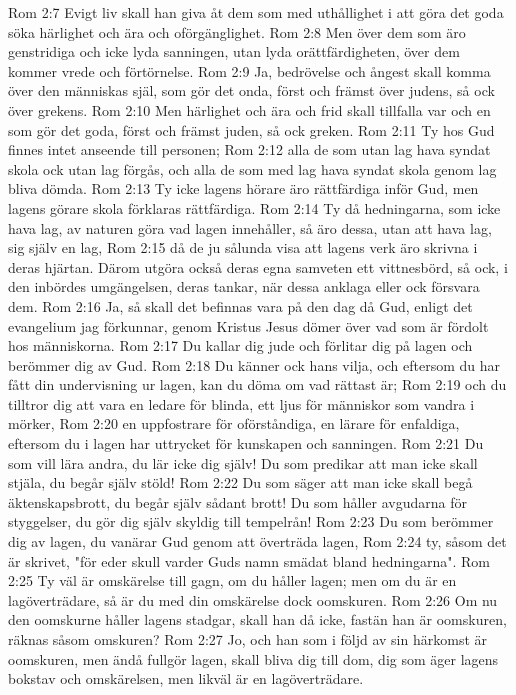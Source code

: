 Rom 2:7  Evigt liv skall han giva åt dem som med uthållighet i att göra det goda söka härlighet och ära och oförgänglighet.
Rom 2:8  Men över dem som äro genstridiga och icke lyda sanningen, utan lyda orättfärdigheten, över dem kommer vrede och förtörnelse.
Rom 2:9  Ja, bedrövelse och ångest skall komma över den människas själ, som gör det onda, först och främst över judens, så ock över grekens.
Rom 2:10  Men härlighet och ära och frid skall tillfalla var och en som gör det goda, först och främst juden, så ock greken.
Rom 2:11  Ty hos Gud finnes intet anseende till personen;
Rom 2:12  alla de som utan lag hava syndat skola ock utan lag förgås, och alla de som med lag hava syndat skola genom lag bliva dömda.
Rom 2:13  Ty icke lagens hörare äro rättfärdiga inför Gud, men lagens görare skola förklaras rättfärdiga.
Rom 2:14  Ty då hedningarna, som icke hava lag, av naturen göra vad lagen innehåller, så äro dessa, utan att hava lag, sig själv en lag,
Rom 2:15  då de ju sålunda visa att lagens verk äro skrivna i deras hjärtan. Därom utgöra också deras egna samveten ett vittnesbörd, så ock, i den inbördes umgängelsen, deras tankar, när dessa anklaga eller ock försvara dem.
Rom 2:16  Ja, så skall det befinnas vara på den dag då Gud, enligt det evangelium jag förkunnar, genom Kristus Jesus dömer över vad som är fördolt hos människorna.
Rom 2:17  Du kallar dig jude och förlitar dig på lagen och berömmer dig av Gud.
Rom 2:18  Du känner ock hans vilja, och eftersom du har fått din undervisning ur lagen, kan du döma om vad rättast är;
Rom 2:19  och du tilltror dig att vara en ledare för blinda, ett ljus för människor som vandra i mörker,
Rom 2:20  en uppfostrare för oförståndiga, en lärare för enfaldiga, eftersom du i lagen har uttrycket för kunskapen och sanningen.
Rom 2:21  Du som vill lära andra, du lär icke dig själv! Du som predikar att man icke skall stjäla, du begår själv stöld!
Rom 2:22  Du som säger att man icke skall begå äktenskapsbrott, du begår själv sådant brott! Du som håller avgudarna för styggelser, du gör dig själv skyldig till tempelrån!
Rom 2:23  Du som berömmer dig av lagen, du vanärar Gud genom att överträda lagen,
Rom 2:24  ty, såsom det är skrivet, "för eder skull varder Guds namn smädat bland hedningarna".
Rom 2:25  Ty väl är omskärelse till gagn, om du håller lagen; men om du är en lagöverträdare, så är du med din omskärelse dock oomskuren.
Rom 2:26  Om nu den oomskurne håller lagens stadgar, skall han då icke, fastän han är oomskuren, räknas såsom omskuren?
Rom 2:27  Jo, och han som i följd av sin härkomst är oomskuren, men ändå fullgör lagen, skall bliva dig till dom, dig som äger lagens bokstav och omskärelsen, men likväl är en lagöverträdare.
